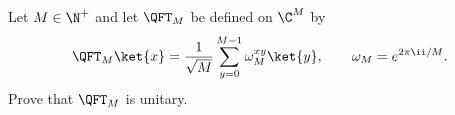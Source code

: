 Let $M\in\N^+$ and let $\QFT_M$ be defined on $\C^M$ by
$$
    \QFT_M\ket{x}=\frac1{\sqrt M}\sum_{y=0}^{M-1}\omega_M^{xy}\ket{y},
    \qquad
    \omega_M=e^{2\pi\ii/M}.
$$
Prove that $\QFT_M$ is unitary.
